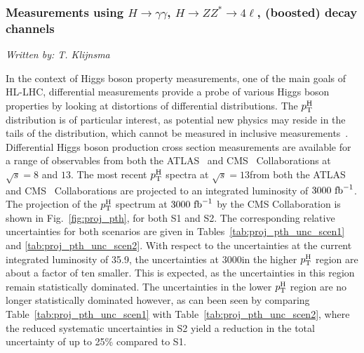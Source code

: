 \subsubsection{Measurements using $H \to \gamma\gamma$, $H \to ZZ^* \to 4\ell$, (boosted) \Hbb decay channels}
\label{sec:diffxs}

\begin{center}{\it Written by: T. Klijnsma} \end{center}



In the context of Higgs boson property measurements, one of the main goals of HL-LHC, differential measurements provide a probe of various Higgs boson properties by looking at distortions of differential distributions.
% 
The $p_\text{T}^\text{H}$ distribution is of particular interest, as potential new physics may reside in the tails of the distribution, which cannot be measured in inclusive measurements~\cite{%
Khachatryan:2016vau,%
Aad:2015zhl,%
CMS:2018lkl%
}.
% 
Differential Higgs boson production cross section measurements are available for a range of observables from both the ATLAS~\cite{%
Aad:2014lwa,%
Aad:2014tca,%
Aad:2016lvc,%
Aaboud:2018xdt,%
Aaboud:2017oem,%
Aaboud:2018ezd%
} and CMS~\cite{%
Khachatryan:2015rxa,%
Khachatryan:2015yvw,%
Khachatryan:2016vnn,%
Sirunyan:2018kta,%
CMS_AN_2016-442,%
CMS-PAS-HIG-17-028%
} Collaborations at $\sqrt{s}=8$ and $13$\UTeV.
% 
The most recent $p_\text{T}^\text{H}$ spectra at $\sqrt{s}=13$\UTeV from both the ATLAS~\cite{Aaboud:2018ezd} and CMS~\cite{CMS-PAS-HIG-17-028} Collaborations are projected to an integrated luminosity of $3000~\text{fb}^{-1}$.
% 
The projection of the $p_\text{T}^\text{H}$ spectrum at $3000~\text{fb}^{-1}$ by the CMS Collaboration is shown in Fig.~\ref{fig:proj_pth}, for both S1 and S2.
% 
The corresponding relative uncertainties for both scenarios are given in Tables~\ref{tab:proj_pth_unc_scen1} and \ref{tab:proj_pth_unc_scen2}.
% 
With respect to the uncertainties at the current integrated luminosity of 35.9\Uifb, the uncertainties at 3000\Uifb in the higher $p_\text{T}^\text{H}$ region are about a factor of ten smaller. This is expected, as the uncertainties in this region remain statistically dominated.
% 
The uncertainties in the lower $p_\text{T}^\text{H}$ region are no longer statistically dominated however, as can been seen by comparing Table~\ref{tab:proj_pth_unc_scen1} with Table~\ref{tab:proj_pth_unc_scen2}, where the reduced systematic uncertainties in S2 yield a reduction in the total uncertainty of up to 25\% compared to S1.


